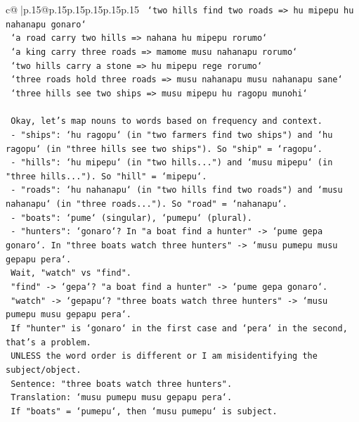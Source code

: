 \documentclass{article}
\begin{document}
{\begin{supertabular}{c@{$\;$}|p{.15\linewidth}@{}p{.15\linewidth}p{.15\linewidth}p{.15\linewidth}p{.15\linewidth}p{.15\linewidth}}
{{{\texttt{   `two hills find two roads => hu mipepu hu nahanapu gonaro`} \\
\texttt{   `a road carry two hills => nahana hu mipepu rorumo`} \\
\texttt{   `a king carry three roads => mamome musu nahanapu rorumo`} \\
\texttt{   `two hills carry a stone => hu mipepu rege rorumo`} \\
\texttt{   `three roads hold three roads => musu nahanapu musu nahanapu sane`} \\
\texttt{   `three hills see two ships => musu mipepu hu ragopu munohi`} \\
\\ 
\texttt{   Okay, let's map nouns to words based on frequency and context.} \\
\texttt{   {-} "ships": `hu ragopu` (in "two farmers find two ships") and `hu ragopu` (in "three hills see two ships"). So "ship" = `ragopu`.} \\
\texttt{   {-} "hills": `hu mipepu` (in "two hills...") and `musu mipepu` (in "three hills..."). So "hill" = `mipepu`.} \\
\texttt{   {-} "roads": `hu nahanapu` (in "two hills find two roads") and `musu nahanapu` (in "three roads..."). So "road" = `nahanapu`.} \\
\texttt{   {-} "boats": `pume` (singular), `pumepu` (plural).} \\
\texttt{   {-} "hunters": `gonaro`? In "a boat find a hunter" {-}> `pume gepa gonaro`. In "three boats watch three hunters" {-}> `musu pumepu musu gepapu pera`.} \\
\texttt{     Wait, "watch" vs "find".} \\
\texttt{     "find" {-}> `gepa`? "a boat find a hunter" {-}> `pume gepa gonaro`.} \\
\texttt{     "watch" {-}> `gepapu`? "three boats watch three hunters" {-}> `musu pumepu musu gepapu pera`.} \\
\texttt{     If "hunter" is `gonaro` in the first case and `pera` in the second, that's a problem.} \\
\texttt{     UNLESS the word order is different or I am misidentifying the subject/object.} \\
\texttt{     Sentence: "three boats watch three hunters".} \\
\texttt{     Translation: `musu pumepu musu gepapu pera`.} \\
\texttt{     If "boats" = `pumepu`, then `musu pumepu` is subject.} \\
}}}
\end{supertabular}}
\end{document}
